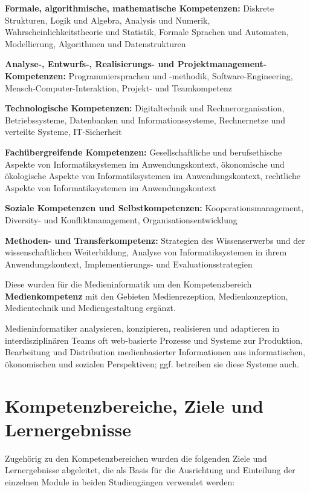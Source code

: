 \textbf{Formale, algorithmische, mathematische Kompetenzen:} Diskrete
Strukturen, Logik und Algebra, Analysis und Numerik,
Wahrscheinlichkeitstheorie und Statistik, Formale Sprachen und
Automaten, Modellierung, Algorithmen und Datenstrukturen

\textbf{Analyse-, Entwurfs-, Realisierungs- und
Projektmanagement-Kompetenzen:} Programmiersprachen und -methodik,
Software-Engineering, Mensch-Computer-Interaktion, Projekt- und
Teamkompetenz

\textbf{Technologische Kompetenzen:} Digitaltechnik und
Rechnerorganisation, Betriebssysteme, Datenbanken und
Informationssysteme, Rechnernetze und verteilte Systeme, IT-Sicherheit

\textbf{Fachübergreifende Kompetenzen:} Gesellschaftliche und
berufsethische Aspekte von Informatiksystemen im Anwendungskontext,
ökonomische und ökologische Aspekte von Informatiksystemen im
Anwendungskontext, rechtliche Aspekte von Informatiksystemen im
Anwendungskontext

\textbf{Soziale Kompetenzen und Selbstkompetenzen:}
Kooperationsmanagement, Diversity- und Konfliktmanagement,
Organisationsentwicklung

\textbf{Methoden- und Transferkompetenz:} Strategien des Wissenserwerbs
und der wissenschaftlichen Weiterbildung, Analyse von Informatiksystemen
in ihrem Anwendungskontext, Implementierungs- und Evaluationsstrategien

Diese wurden für die Medieninformatik um den Kompetenzbereich
\textbf{Medienkompetenz} mit den Gebieten Medienrezeption,
Medienkonzeption, Medientechnik und Mediengestaltung ergänzt.

Medieninformatiker analysieren, konzipieren, realisieren und adaptieren
in interdisziplinären Teams oft web-basierte Prozesse und Systeme zur
Produktion, Bearbeitung und Distribution medienbasierter Informationen
aus informatischen, ökonomischen und sozialen Perspektiven; ggf.
betreiben sie diese Systeme auch.

\section{Kompetenzbereiche, Ziele und
Lernergebnisse}\label{kompetenzbereiche-ziele-und-lernergebnisse}

Zugehörig zu den Kompetenzbereichen wurden die folgenden Ziele und
Lernergebnisse abgeleitet, die als Basis für die Ausrichtung und
Einteilung der einzelnen Module in beiden Studiengängen verwendet
werden:

